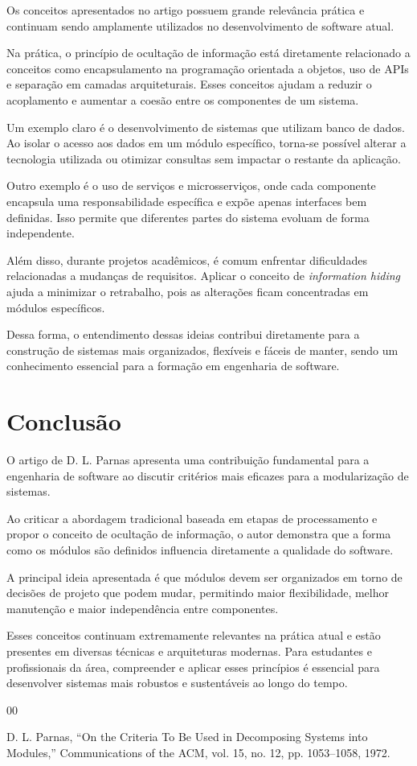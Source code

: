 \documentclass[conference]{IEEEtran}
\begin{document}
Os conceitos apresentados no artigo possuem grande relevância prática e continuam sendo amplamente utilizados no desenvolvimento de software atual.

Na prática, o princípio de ocultação de informação está diretamente relacionado a conceitos como encapsulamento na programação orientada a objetos, uso de APIs e separação em camadas arquiteturais. Esses conceitos ajudam a reduzir o acoplamento e aumentar a coesão entre os componentes de um sistema.

Um exemplo claro é o desenvolvimento de sistemas que utilizam banco de dados. Ao isolar o acesso aos dados em um módulo específico, torna-se possível alterar a tecnologia utilizada ou otimizar consultas sem impactar o restante da aplicação.

Outro exemplo é o uso de serviços e microsserviços, onde cada componente encapsula uma responsabilidade específica e expõe apenas interfaces bem definidas. Isso permite que diferentes partes do sistema evoluam de forma independente.

Além disso, durante projetos acadêmicos, é comum enfrentar dificuldades relacionadas a mudanças de requisitos. Aplicar o conceito de \textit{information hiding} ajuda a minimizar o retrabalho, pois as alterações ficam concentradas em módulos específicos.

Dessa forma, o entendimento dessas ideias contribui diretamente para a construção de sistemas mais organizados, flexíveis e fáceis de manter, sendo um conhecimento essencial para a formação em engenharia de software.

\section{Conclusão}

O artigo de D. L. Parnas apresenta uma contribuição fundamental para a engenharia de software ao discutir critérios mais eficazes para a modularização de sistemas.

Ao criticar a abordagem tradicional baseada em etapas de processamento e propor o conceito de ocultação de informação, o autor demonstra que a forma como os módulos são definidos influencia diretamente a qualidade do software.

A principal ideia apresentada é que módulos devem ser organizados em torno de decisões de projeto que podem mudar, permitindo maior flexibilidade, melhor manutenção e maior independência entre componentes.

Esses conceitos continuam extremamente relevantes na prática atual e estão presentes em diversas técnicas e arquiteturas modernas. Para estudantes e profissionais da área, compreender e aplicar esses princípios é essencial para desenvolver sistemas mais robustos e sustentáveis ao longo do tempo.

\begin{thebibliography}{00}

D. L. Parnas,
``On the Criteria To Be Used in Decomposing Systems into Modules,''
Communications of the ACM, vol. 15, no. 12, pp. 1053--1058, 1972.

\end{thebibliography}
\end{document}
